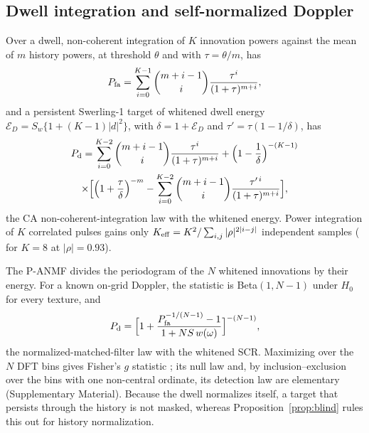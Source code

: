 \documentclass[journal]{IEEEtran}
\begin{document}
\subsection{Dwell integration and self-normalized Doppler}
Over a dwell, non-coherent integration of $K$ innovation powers against the mean of $m$ history powers, at threshold $\theta$ and with $\tau=\theta/m$, has
\begin{equation}
P_{\rm fa}=\sum_{i=0}^{K-1}\binom{m+i-1}{i}\frac{\tau^i}{(1+\tau)^{m+i}},
\label{eq:dwellpfa}
\end{equation}
and a persistent Swerling-1 target of whitened dwell energy $\mathcal E_D=S_w\{1+(K-1)|d|^2\}$, with $\delta=1+\mathcal E_D$ and $\tau'=\tau(1-1/\delta)$, has
\begin{multline}
P_{\rm d}=\sum_{i=0}^{K-2}\binom{m+i-1}{i}\frac{\tau^i}{(1+\tau)^{m+i}}+\Big(1-\frac1\delta\Big)^{-(K-1)}\\
\times\Big[\Big(1+\frac{\tau}{\delta}\Big)^{-m}-\sum_{i=0}^{K-2}\binom{m+i-1}{i}\frac{\tau'^{\,i}}{(1+\tau)^{m+i}}\Big],
\label{eq:dwellpd}
\end{multline}
the CA non-coherent-integration law \cite{gandhi1988,richards2014} with the whitened energy. Power integration of $K$ correlated pulses gains only $K_{\rm eff}=K^2/\sum_{i,j}|\rho|^{2|i-j|}$ independent samples (\ThKeff{} for $K=8$ at $|\rho|=0.93$).

The P-ANMF divides the periodogram of the $N$ whitened innovations by their energy. For a known on-grid Doppler, the statistic is Beta$(1,N-1)$ under $H_0$ for every texture, and
\begin{equation}
P_{\rm d}=\Big[1+\frac{P_{\rm fa}^{-1/(N-1)}-1}{1+N S\,w(\omega)}\Big]^{-(N-1)},
\label{eq:panmf}
\end{equation}
the normalized-matched-filter law \cite{kraut1999,conte1995} with the whitened SCR. Maximizing over the $N$ DFT bins gives Fisher's $g$ statistic \cite{fisher1929g}; its null law and, by inclusion--exclusion over the bins with one non-central ordinate, its detection law are elementary (Supplementary Material). Because the dwell normalizes itself, a target that persists through the history is not masked, whereas Proposition~\ref{prop:blind} rules this out for history normalization.
\end{document}
